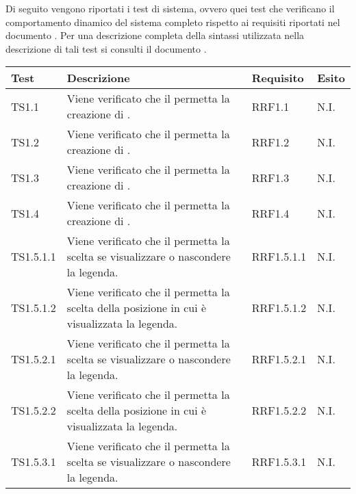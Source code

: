 Di seguito vengono riportati i test di sistema, ovvero quei test che verificano il comportamento dinamico del sistema completo rispetto ai requisiti riportati nel documento . Per una descrizione completa della sintassi utilizzata nella descrizione di tali test si consulti il documento .


\begin{longtabu}{| X[0.5] | X | X[0.5] | X[0.4] |}

			\hline
			\rowfont{\bf}
			Test &
			Descrizione &
			Requisito &
			Esito \\
			\hline \endhead


TS1.1 & Viene verificato che il  permetta la creazione di . & RRF1.1 & N.I.\\ \hline

TS1.2 & Viene verificato che il  permetta la creazione di . & RRF1.2 & N.I.\\ \hline

TS1.3 & Viene verificato che il  permetta la creazione di . & RRF1.3 & N.I.\\ \hline

TS1.4 & Viene verificato che il  permetta la creazione di . & RRF1.4 & N.I.\\ \hline

TS1.5.1.1 & Viene verificato che il  permetta la scelta se visualizzare o nascondere la legenda. & RRF1.5.1.1 & N.I.\\ \hline

TS1.5.1.2 & Viene verificato che il  permetta la scelta della posizione in cui è visualizzata la legenda. & RRF1.5.1.2 & N.I.\\ \hline

TS1.5.2.1 & Viene verificato che il  permetta la scelta se visualizzare o nascondere la legenda. & RRF1.5.2.1 & N.I.\\ \hline

TS1.5.2.2 & Viene verificato che il  permetta la scelta della posizione in cui è visualizzata la legenda. & RRF1.5.2.2 & N.I.\\ \hline

TS1.5.3.1 & Viene verificato che il  permetta la scelta se visualizzare o nascondere la legenda. & RRF1.5.3.1 & N.I.\\ \hline


\end{longtabu}
